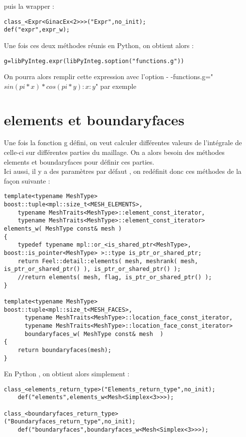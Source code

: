 \documentclass[12pt]{article}
\begin{document}
puis la wrapper :

\begin{lstlisting}
class_<Expr<GinacEx<2>>>("Expr",no_init);
def("expr",expr_w);
\end{lstlisting}


Une fois ces deux méthodes réunis en Python, on obtient alors :

\begin{lstlisting}
g=libPyInteg.expr(libPyInteg.soption("functions.g"))
\end{lstlisting}

On pourra alors remplir cette expression avec l'option - -functions.g="$sin(pi*x)*cos(pi*y):x:y$" par exemple

\section{elements et boundaryfaces}

Une fois la fonction g défini, on veut calculer différentes valeurs de l'intégrale de celle-ci sur différentes parties du maillage. On a alors besoin des méthodes elements et boundaryfaces pour définir ces parties.\\
Ici aussi, il y a des paramètres par défaut , on redéfinit donc ces méthodes de la façon suivante :

\begin{lstlisting}
template<typename MeshType>
boost::tuple<mpl::size_t<MESH_ELEMENTS>,
    typename MeshTraits<MeshType>::element_const_iterator,
    typename MeshTraits<MeshType>::element_const_iterator>
elements_w( MeshType const& mesh )
{
    typedef typename mpl::or_<is_shared_ptr<MeshType>, boost::is_pointer<MeshType> >::type is_ptr_or_shared_ptr;
    return Feel::detail::elements( mesh, meshrank( mesh, is_ptr_or_shared_ptr() ), is_ptr_or_shared_ptr() );
    //return elements( mesh, flag, is_ptr_or_shared_ptr() );
}

template<typename MeshType>
boost::tuple<mpl::size_t<MESH_FACES>,
      typename MeshTraits<MeshType>::location_face_const_iterator,
      typename MeshTraits<MeshType>::location_face_const_iterator>
      boundaryfaces_w( MeshType const& mesh  )
{
    return boundaryfaces(mesh);
}
\end{lstlisting}

En Python , on obtient alors simplement :

\begin{lstlisting}
class_<elements_return_type>("Elements_return_type",no_init);
    def("elements",elements_w<Mesh<Simplex<3>>>);

class_<boundaryfaces_return_type>("Boundaryfaces_return_type",no_init);
    def("boundaryfaces",boundaryfaces_w<Mesh<Simplex<3>>>);

\end{lstlisting}
\end{document}
